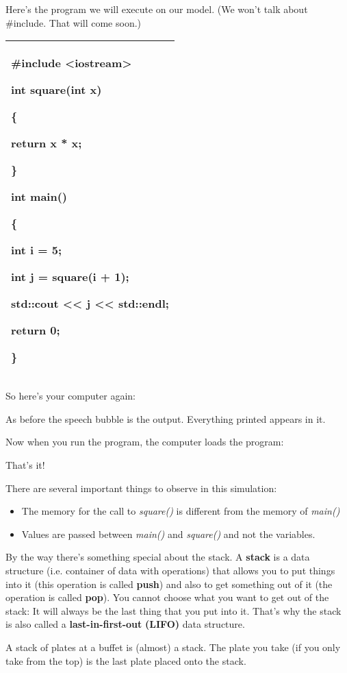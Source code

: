 \documentclass[
]{article}
\providecommand{\tightlist}{%
  \setlength{\itemsep}{0pt}\setlength{\parskip}{0pt}}
\begin{document}
Here's the program we will execute on our model. (We won't talk about
\#include. That will come soon.)

\begin{longtable}[]{@{}l@{}}
\toprule
\endhead
\begin{minipage}[t]{0.97\columnwidth}\raggedright
\#include \textless iostream\textgreater{}

int square(int x)

\{

return x * x;

\}

int main()

\{

int i = 5;

int j = square(i + 1);

std::cout \textless\textless{} j \textless\textless{} std::endl;

return 0;

\}\strut
\end{minipage}\tabularnewline
\bottomrule
\end{longtable}

So here's your computer again:

As before the speech bubble is the output. Everything printed appears in
it.

Now when you run the program, the computer loads the program:

That's it!

There are several important things to observe in this simulation:

\begin{itemize}
\tightlist
\item
  The memory for the call to \emph{square()} is different from the
  memory of \emph{main()}
\item
  Values are passed between \emph{main()} and \emph{square()} and not
  the variables.
\end{itemize}

By the way there's something special about the stack. A \textbf{stack}
is a data structure (i.e. container of data with operations) that allows
you to put things into it (this operation is called \textbf{push}) and
also to get something out of it (the operation is called \textbf{pop}).
You cannot choose what you want to get out of the stack: It will always
be the last thing that you put into it. That's why the stack is also
called a \textbf{last-in-first-out} \textbf{(LIFO)} data structure.

A stack of plates at a buffet is (almost) a stack. The plate you take
(if you only take from the top) is the last plate placed onto the stack.
\end{document}
